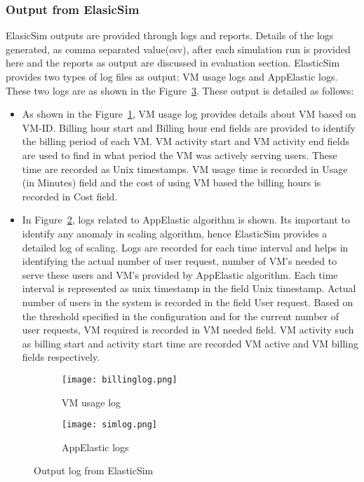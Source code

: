 \subsubsection{Output from ElasicSim}
\label{subs:Output from ElasicSim}
ElasicSim outputs are provided through logs and reports. Details of the logs generated, as comma separated value(csv), after each simulation run is provided here and the reports as output are discussed in evaluation section. ElasticSim provides two types of log files as output: VM usage logs and AppElastic logs. These two logs are as shown in the Figure~\ref{fig:elasticsimlogs}. These output is detailed as follows:
\begin{itemize}
  \item As shown in the Figure~\ref{figure:costlog}, VM usage log provides details about VM based on VM-ID. Billing hour start and Billing hour end fields are provided to identify the billing period of each VM. VM activity start and VM activity end fields are used to find in what period the VM was actively serving users. These time are recorded as Unix timestamps. VM usage time is recorded in Usage (in Minutes) field and the cost of using VM based the billing hours is recorded in Cost field.
  \item In Figure~\ref{figure:appelasticlogs}, logs related to AppElastic algorithm is shown. Its important to identify any anomaly in scaling algorithm, hence ElasticSim provides a detailed log of scaling. Logs are recorded for each time interval and helps in identifying the actual number of user request, number of VM's needed to serve these users and VM's provided by AppElastic algorithm. Each time interval is represented as unix timestamp in the field Unix timestamp. Actual number of users in the system is recorded in the field User request. Based on the threshold specified in the configuration and for the current number of user requests, VM required is recorded in VM needed field. VM activity such as billing start and activity start time are recorded VM active and VM billing fields respectively.
\end{itemize}
\begin{figure}
     \centering
     \begin{subfigure}[b]{1.0\textwidth}
         \texttt{[image: billinglog.png]}
         \caption{VM usage log}
         \label{figure:costlog}
     \end{subfigure}
     \begin{subfigure}[b]{0.9\textwidth}
         \texttt{[image: simlog.png]}
         \caption{AppElastic logs}
         \label{figure:appelasticlogs}
     \end{subfigure}
     \caption{Output log from ElasticSim}
     \label{fig:elasticsimlogs}
 \end{figure}
